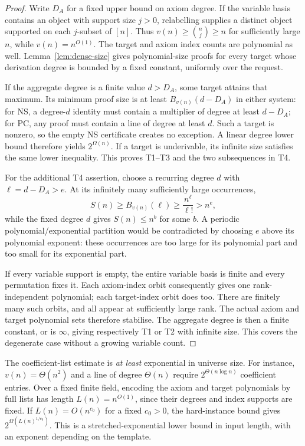 \documentclass[11pt,a4paper]{article}
\theoremstyle{definition}\newtheorem{definition}[theorem]{Definition}
\theoremstyle{remark}\newtheorem{remark}[theorem]{Remark}
\begin{document}
\begin{proof}
Write $D_A$ for a fixed upper bound on axiom degree. If the variable
basis contains an object with support size $j>0$, relabelling supplies
a distinct object supported on each $j$-subset of $[n]$. Thus
$v(n)\ge\binom nj\ge n$ for sufficiently large $n$, while
$v(n)=n^{O(1)}$. The target and axiom index counts are polynomial as well.
Lemma~\ref{lem:dense-size} gives polynomial-size proofs for every target
whose derivation degree is bounded by a fixed constant, uniformly over
the request.

If the aggregate degree is a finite value $d>D_A$, some target attains
that maximum. Its minimum proof size is at least
$B_{v(n)}(d-D_A)$ in either system: for NS, a degree-$d$ identity must
contain a multiplier of degree at least $d-D_A$; for PC, any proof must
contain a line of degree at least $d$. Such a target is nonzero, so the
empty NS certificate creates no exception. A linear degree lower bound
therefore yields $2^{\Omega(n)}$. If a target is underivable, its infinite
size satisfies the same lower inequality. This proves T1--T3 and the two
subsequences in T4.

For the additional T4 assertion, choose a recurring degree $d$ with
$\ell=d-D_A>e$. At its infinitely many sufficiently large occurrences,
\[
                   S(n)\ge B_{v(n)}(\ell)
                        \ge\frac{n^{\ell}}{\ell!}>n^e,
\]
while the fixed degree $d$ gives $S(n)\le n^b$ for some $b$.
A periodic polynomial/exponential partition would be contradicted by
choosing $e$ above its polynomial exponent: these occurrences are too
large for its polynomial part and too small for its exponential part.

If every variable support is empty, the entire variable basis is finite
and every permutation fixes it. Each axiom-index orbit consequently
gives one rank-independent polynomial; each target-index orbit does too.
There are finitely many such orbits, and all appear at sufficiently
large rank. The actual axiom and target polynomial sets therefore
stabilise. The aggregate degree is then a finite constant, or is
$\infty$, giving respectively T1 or T2 with infinite size. This covers
the degenerate case without a growing variable count.
\end{proof}

The coefficient-list estimate is \emph{at least} exponential in universe
size. For instance, $v(n)=\Theta(n^2)$ and a line of degree $\Theta(n)$
require $2^{\Theta(n\log n)}$ coefficient entries. Over a fixed finite
field, encoding the axiom and target polynomials by full lists has length
$L(n)=n^{O(1)}$, since their degrees and index supports are fixed.
If $L(n)=O(n^{c_0})$ for a fixed $c_0>0$, the hard-instance bound gives
$2^{\Omega(L(n)^{1/c_0})}$. This is a stretched-exponential lower bound in
input length, with an exponent depending on the template.
\end{document}
